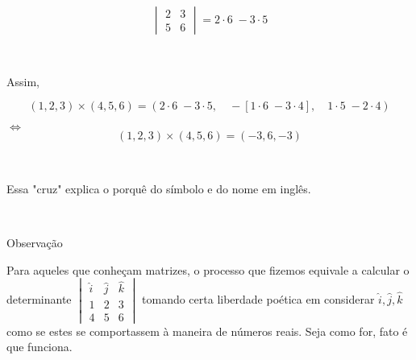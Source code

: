 \[
\begin{vmatrix} 2 & 3 \\ 5 & 6 \end{vmatrix} = 2 \cdot 6\;- 3 \cdot 5
\]

 

Assim,

\[ (1, 2, 3) \times (4, 5, 6) =
\left(
2 \cdot 6\;- 3 \cdot 5,\quad
-[1 \cdot 6\;- 3 \cdot 4],\quad
1 \cdot 5\; - 2 \cdot 4
\right)
\]

\(\Longleftrightarrow\) \[ (1, 2, 3) \times (4, 5, 6) =
\left(
-3 ,
6,
-3
\right)
\]

 

Essa "cruz" explica o porquê do símbolo e do nome em inglês.

 

Observação

Para aqueles que conheçam matrizes, o processo que fizemos equivale a calcular o determinante \( \begin{vmatrix} \hat{i} & \hat{j} & \hat{k} \\ 1 & 2 & 3 \\ 4 & 5 & 6 \end{vmatrix} \) tomando certa liberdade poética em considerar \( \hat{i}, \hat{j},\hat{k} \) como se estes se comportassem à maneira de números reais. Seja como for, fato é que funciona.